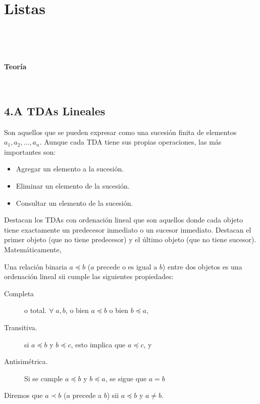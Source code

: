 


\chapter{Listas}

\localtableofcontents

\

\

\centerline{\Large \bf Teoría}

\formatoNormal



\




\section*{4.A TDAs Lineales}


Son aquellos que se pueden expresar como una sucesión finita de elementos $a_1, a_2,\ldots, a_n$. Aunque cada TDA tiene sus propias operaciones, las más importantes son:
\begin{itemize}
\item Agregar un elemento a la sucesión.
\item Eliminar un elemento de la sucesión.
\item Consultar un elemento de la sucesión. 
\end{itemize}


Destacan los TDAs con ordenación lineal que son aquellos donde cada objeto tiene exactamente un predecesor inmediato o un sucesor inmediato. Destacan el primer objeto (que no tiene predecesor) y el último objeto (que no tiene sucesor). Matemáticamente,

Una relación binaria $a\preceq b$ ($a$ precede o es igual a $b$) entre dos objetos es una ordenación lineal sii cumple las siguientes propiedades:
\begin{description}
\item[Completa]  o total. $\forall \; a, b$, o bien $a\preceq b$ o bien $b\preceq a$,
\item[Transitiva.] si $a\preceq b$ y $b\preceq c$, esto implica que $a\preceq c$, y
\item[Antisimétrica.] Si se cumple   $a\preceq b$ y $b\preceq a$, se sigue que $a = b$
\end{description}
Diremos que $a\prec b$ ($a$ precede a $b$) sii $a\preceq b$ y $a\not = b$.

